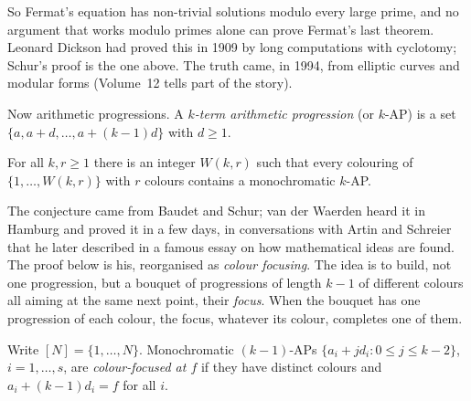 So Fermat's equation has non-trivial solutions modulo every large prime, and no argument that works modulo primes alone can prove Fermat's last theorem.
Leonard Dickson had proved this in 1909 by long computations with cyclotomy; Schur's proof is the one above. The truth came, in 1994, from elliptic curves and modular forms (Volume~12 tells part of the story).

Now arithmetic progressions. A \emph{$k$-term arithmetic progression} (or $k$-AP) is a set $\{a,a+d,\dots,a+(k-1)d\}$ with $d\ge1$.

\begin{theorem}\label{extremal:thm:vdw}
For all $k,r\ge1$ there is an integer $W(k,r)$ such that every colouring of $\{1,\dots,W(k,r)\}$ with $r$ colours contains a monochromatic $k$-AP.
\end{theorem}

The conjecture came from Baudet and Schur; van der Waerden heard it in Hamburg and proved it in a few days, in conversations with Artin and Schreier that
he later described in a famous essay on how mathematical ideas are found. The proof below is his, reorganised as \emph{colour focusing}. The idea is to build,
not one progression, but a bouquet of progressions of length $k-1$ of different colours all aiming at the same next point, their \emph{focus}. When the bouquet has
one progression of each colour, the focus, whatever its colour, completes one of them.

Write $[N]=\{1,\dots,N\}$. Monochromatic $(k-1)$-APs $\{a_i+jd_i:0\le j\le k-2\}$, $i=1,\dots,s$, are \emph{colour-focused at $f$} if they have distinct colours and $a_i+(k-1)d_i=f$
for all $i$.

